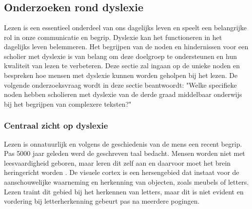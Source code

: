 \chapter{}%
\label{ch:stand-van-zaken}

\section{Onderzoeken rond dyslexie}

Lezen is een essentieel onderdeel van ons dagelijks leven en speelt een belangrijke rol in onze communicatie en begrip. Dyslexie kan het functioneren in het dagelijks leven belemmeren. Het begrijpen van de noden en hindernissen voor een scholier met dyslexie is van belang om deze doelgroep te ondersteunen en hun kwaliteit van lezen te verbeteren. Deze sectie zal ingaan op de unieke noden en bespreken hoe mensen met dyslexie kunnen worden geholpen bij het lezen. De volgende onderzoeksvraag wordt in deze sectie beantwoordt: "Welke specifieke noden hebben scholieren met dyslexie van de derde graad middelbaar onderwijs bij het begrijpen van complexere teksten?"

\subsection{Centraal zicht op dyslexie}

Lezen is onnatuurlijk en volgens de geschiedenis van de mens een recent begrip. Pas 5000 jaar geleden werd de geschreven taal bedacht. Mensen worden niet met leesvaardigheid geboren, maar leren dit zelf aan en daarvoor moet het brein heringericht worden \autocite{Bonte2020, VanDerMeer2022}. De visuele cortex is een hersengebied dat instaat voor de aanschouwelijke waarneming en herkenning van objecten, zoals meubels of letters. Lezen traint dit gebied bij het herkennen van letters, maar dit is niet evident en vordering bij letterherkenning gebeurt pas na meerdere pogingen. 

 

